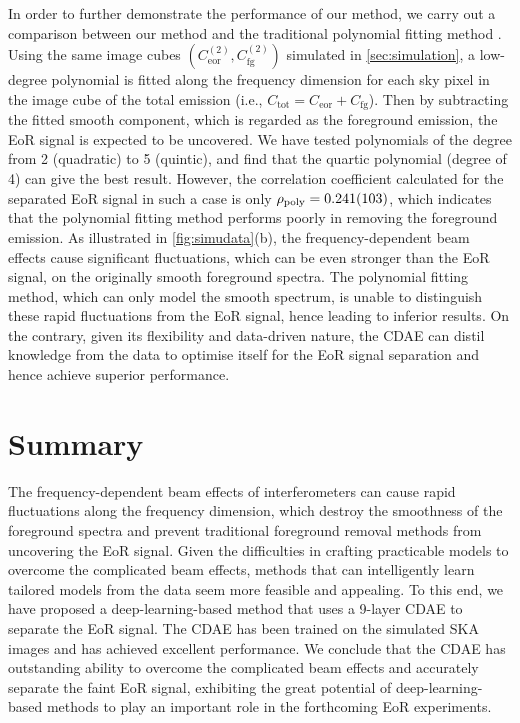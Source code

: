 \documentclass[fleqn,usenatbib]{mnras}
\newcommand{\R}[1]{\mathrm{#1}}
\newcommand{\editwip}[1]{{\leavevmode\color{magenta}#1}}
\begin{document}
In order to further demonstrate the performance of our method, we carry
out a comparison between our method and the traditional polynomial
fitting method \citep[e.g.,][]{wang2006,liu2009ps}.
Using the same image cubes
\editwip{$\left( C_{\R{eor}}^{(2)}, C_{\R{fg}}^{(2)} \right)$}
simulated in \autoref{sec:simulation},
a low-degree polynomial is fitted along the frequency dimension for each
sky pixel in the image cube of the total emission (i.e.,
$C_{\R{tot}} = C_{\R{eor}} + C_{\R{fg}}$).
Then by subtracting the fitted smooth component, which is regarded as
the foreground emission, the EoR signal is expected to be uncovered.
We have tested polynomials of the degree from 2 (quadratic) to
5 (quintic), and find that the quartic polynomial (degree of 4)
can give the best result.
However, the correlation coefficient calculated for the separated EoR
signal in such a case is only $\rho_{\R{poly}} = \num{0.241 +- 0.103}$,
which indicates that the polynomial fitting method
performs poorly in removing the foreground emission.
As illustrated in \autoref{fig:simudata}(b), the frequency-dependent
beam effects cause significant fluctuations, which can be even stronger
than the EoR signal, on the originally smooth foreground spectra.
The polynomial fitting method, which can only model the smooth
spectrum, is unable to distinguish these rapid fluctuations from the
EoR signal, hence leading to inferior results.
On the contrary, given its flexibility and data-driven nature,
the CDAE can distil knowledge from the data to optimise itself for
the EoR signal separation and hence achieve superior performance.


\section{Summary}
\label{sec:summary}

The frequency-dependent beam effects of interferometers can cause
rapid fluctuations along the frequency dimension,
which destroy the smoothness of the foreground spectra and prevent
traditional foreground removal methods from uncovering the EoR signal.
Given the difficulties in crafting practicable models to overcome the
complicated beam effects, methods that can intelligently learn tailored
models from the data seem more feasible and appealing.
To this end, we have proposed a deep-learning-based method that uses
a 9-layer CDAE to separate the EoR signal.
The CDAE has been trained on the simulated SKA images and has achieved
excellent performance.
We conclude that the CDAE has outstanding ability to overcome the
complicated beam effects and accurately separate the faint EoR signal,
exhibiting the great potential of deep-learning-based methods
to play an important role in the forthcoming EoR experiments.
\end{document}
